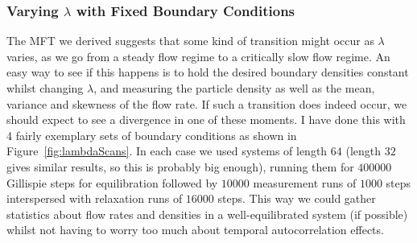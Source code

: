 \subsubsection{Varying $\lambda$ with Fixed Boundary Conditions}
The MFT we derived suggests that some kind of transition might occur as $\lambda$ varies, as we go from a steady flow regime to a critically slow flow regime. An easy way to see if this happens is to hold the desired boundary densities constant
whilst changing $\lambda$, and measuring the particle density as well as the mean, variance and skewness of the flow rate. If such a transition does indeed occur, we should expect to see a divergence in one of these moments. I have done this with
4 fairly exemplary sets of boundary conditions as shown in Figure~\ref{fig:lambdaScans}. In each case we used systems of length $64$ (length $32$ gives similar results, so this
is probably big enough), running them for $400000$ Gillispie steps for equilibration followed by $10000$ measurement runs of $1000$ steps interspersed with relaxation runs of $16000$
steps. This way we could gather statistics about flow rates and densities in a well-equilibrated system (if possible) whilst not having to worry too much about temporal autocorrelation effects.

